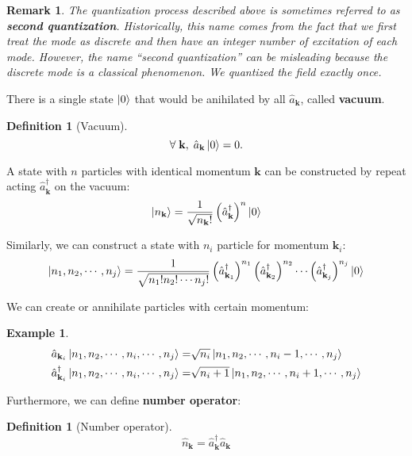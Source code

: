 \documentclass[12pt]{article}
\numberwithin{equation}{section}
\theoremstyle{1style}
\newtheorem{definition}[equation]{Definition}
\newtheorem{example}[equation]{Example}
\newtheorem*{remark}{Remark}
\newcommand{\tbf}[1]{\textbf{#1}}
\begin{document}
\begin{remark}
  The quantization process described above is sometimes referred to as \tbf{second quantization}. Historically, this name
  comes from the fact that we first treat the mode as discrete and then have an integer number of excitation of each mode.
  However, the name ``second quantization'' can be misleading because the discrete mode is a classical phenomenon.
  We quantized the field exactly once.
\end{remark}


There is a single state \(\ket{0}\) that would be anihilated by all \(\hat{a}_{\mathbf{k}}\), called \tbf{vacuum}.
\begin{definition}[Vacuum]
  \[\forall\; \mathbf{k},\; \hat{a}_{\mathbf{k}}\ket{0}=0.\]
\end{definition}

A state with \(n\) particles with identical momentum \(\mathbf{k}\) can be constructed by repeat acting \(\hat{a}^{\dagger}_{\mathbf{k}}\)
on the vacuum:
\begin{equation}
  \ket{n_{\mathbf{k}}}=\frac{1}{\sqrt{n_{\mathbf{k}}!}}\left(\hat{a}^{\dagger}_{\mathbf{k}}\right)^{n}\ket{0}
\end{equation}

Similarly, we can construct a state with \(n_{i}\) particle for momentum \(\mathbf{k}_i\):
\begin{equation}
  \ket{n_1,n_2,\cdots,n_j}=\frac{1}{\sqrt{n_1!n_2!\cdots n_j!}}\left(\hat{a}^{\dagger}_{\mathbf{k}_1}\right)^{n_1}
  \left(\hat{a}^{\dagger}_{\mathbf{k}_2}\right)^{n_2}\cdots \left(\hat{a}^{\dagger}_{\mathbf{k}_j}\right)^{n_j}\ket{0}
\end{equation}

We can create or annihilate particles with certain momentum:
\begin{example}
  \begin{align*}
    \hat{a}_{\mathbf{k}_i}\ket{n_1,n_2,\cdots,n_i,\cdots,n_j}=           & \sqrt{n_i}\ket{n_1,n_2,\cdots,n_i-1,\cdots,n_j}   \\
    \hat{a}^{\dagger}_{\mathbf{k}_i}\ket{n_1,n_2,\cdots,n_i,\cdots,n_j}= & \sqrt{n_i+1}\ket{n_1,n_2,\cdots,n_i+1,\cdots,n_j}
  \end{align*}
\end{example}

Furthermore, we can define \tbf{number operator}:
\begin{definition}[Number operator]
  \[\hat{n}_{\mathbf{k}}=\hat{a}^\dagger_{\mathbf{k}}\hat{a}_{\mathbf{k}}\]
\end{definition}
\end{document}

